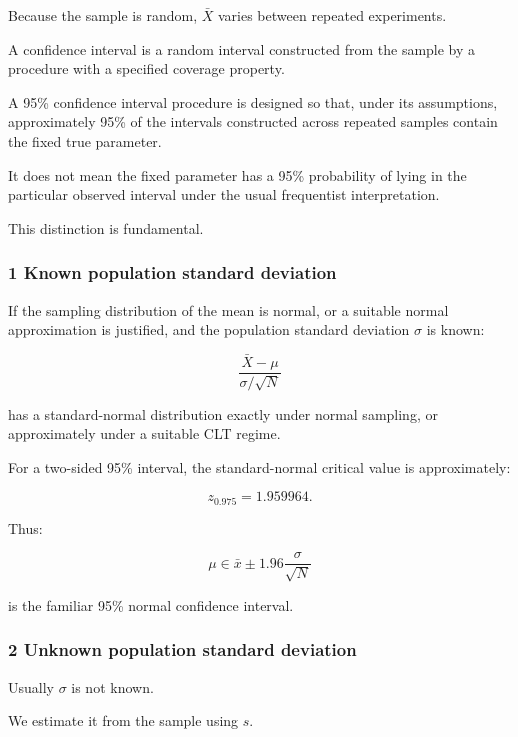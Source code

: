 Because the sample is random, \(\bar X\) varies between repeated experiments.

A confidence interval is a random interval constructed from the sample by a procedure with a specified coverage property.

A 95\% confidence interval procedure is designed so that, under its assumptions, approximately 95\% of the intervals constructed across repeated samples contain the fixed true parameter.

It does not mean the fixed parameter has a 95\% probability of lying in the particular observed interval under the usual frequentist interpretation.

This distinction is fundamental.

\subsubsection{1 Known population standard deviation}\label{02-foundations-ii-ch030-known-population-standard-deviation}

\hypertarget{02-foundations-ii-ch030-known-population-standard-deviation}{}

If the sampling distribution of the mean is normal, or a suitable normal approximation is justified, and the population standard deviation \(\sigma\) is known:

\[
 \frac{\bar X-\mu}{\sigma/\sqrt N}
\]

has a standard-normal distribution exactly under normal sampling, or approximately under a suitable CLT regime.

For a two-sided 95\% interval, the standard-normal critical value is approximately:

\[
 z_{0.975}=1.959964.
\]

Thus:

\[
 \boxed{ \mu\in \bar x\pm1.96\frac{\sigma}{\sqrt N} }
\]

is the familiar 95\% normal confidence interval.

\subsubsection{2 Unknown population standard deviation}\label{02-foundations-ii-ch030-unknown-population-standard-deviation}

\hypertarget{02-foundations-ii-ch030-unknown-population-standard-deviation}{}

Usually \(\sigma\) is not known.

We estimate it from the sample using \(s\).

